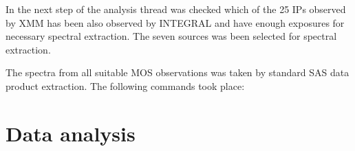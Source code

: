 \documentclass[oneside,a4paper,11pt]{report}
\begin{document}
In the next step of the analysis thread was checked which of the 25 IPs observed by XMM has been also 
observed by INTEGRAL and have enough exposures for necessary spectral extraction. The seven sources 
was been selected for spectral extraction.   

The spectra from all suitable MOS observations was taken by standard SAS data product extraction. The 
following commands took place:



 
 



\section{Data analysis}
\end{document}
